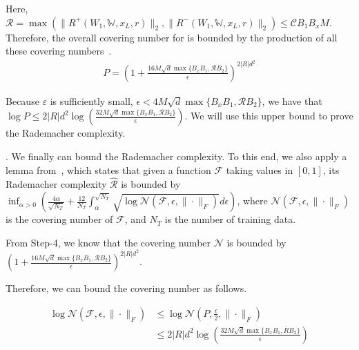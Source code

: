 Here, ${\mathcal R} = \max(\|R^+(W_1,\mathds{W},x_L,r)\|_2,
\|R^-(W_1,\mathds{W},x_L,r)\|_2) \leq {\mathcal C} B_1  B_xM$.
Therefore, the overall covering number for \HGIN is bounded
by the production of all these covering numbers~\cite{Gen-bound}.
\begin{align*}P=\left(1+\frac{16M\sqrt d\max\{B_xB_1,{\mathcal R}B_2\}}
{\epsilon}\right)^{2|R|d^2}\end{align*}

Because $\varepsilon$ is sufficiently small, 
\eg $\epsilon<4M\sqrt{d}\max\{B_xB_1,{\mathcal R}B_2\}$,
we have that $\log P\leq 2|R|d^2\log\left(\frac{32M\sqrt{d}\max\{B_xB_1,{\mathcal R}
B_2\}}{\epsilon}\right)$.
We will use this upper bound to prove the Rademacher complexity.


.
We finally can bound the Rademacher complexity.
To this end, we also apply a lemma from~\cite{RB-1},
which states that 
given a function ${\mathcal F}$ taking values
in $[0,1]$, 
its Rademacher complexity 
$\hat{\mathcal{R}}$ 
is bounded by $\inf_{\alpha>0}\left(\frac{4\alpha}{\sqrt{N_T}}+\frac{12}{N_T}\int_{\alpha}^{\sqrt{N_T}}\sqrt{\log\mathcal{N}(\mathcal{F},\epsilon,\|\cdot\|_F)}d\epsilon\right)$,
where $\mathcal{N}(\mathcal{F},\epsilon,\|\cdot\|_F)$ is the covering 
number of $\mathcal{F}$, and
$N_T$ is the number of training data.


From Step-4, we know that the covering number ${\mathcal N}$
is bounded by $\left(1+\frac{16M\sqrt d\max\{B_xB_1,{\mathcal R}B_2\}}
{\epsilon}\right)^{2|R|d^2}$.

Therefore, we can bound the covering number as follows.

\begin{align*}
\log \mathcal{N}(\mathcal{F},\epsilon,\|\cdot\|_F)&\leq 
\log \mathcal{N}(P,\frac{\epsilon}{2},\|\cdot\|_F)\\
&
\leq 2|R|d^2\log\left(\frac{32M\sqrt{d}\max\{B_xB_1,\overline{R}
	B_2\}}{\epsilon}\right)
\end{align*}

